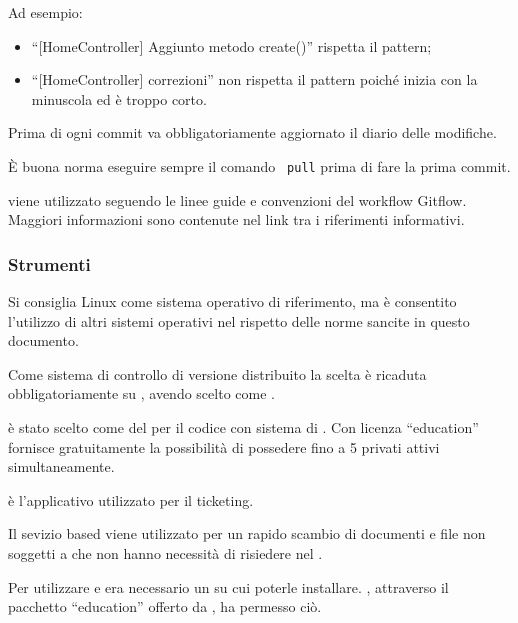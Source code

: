 \documentclass[a4paper, titlepage]{article}
\begin{document}
Ad esempio:
\begin{itemize}
	\item ``[HomeController] Aggiunto metodo create()'' rispetta il pattern;
	\item ``[HomeController] correzioni'' non rispetta il pattern poiché inizia con la minuscola ed è troppo corto. 
\end{itemize}

Prima di ogni commit va obbligatoriamente aggiornato il diario delle modifiche.

È buona norma eseguire sempre il comando \texttt{ pull} prima di fare la prima commit.

 viene utilizzato seguendo le linee guide e convenzioni del workflow Gitflow. Maggiori informazioni sono contenute nel link tra i riferimenti informativi.

\subsubsection{Strumenti}

Si consiglia Linux come sistema operativo di riferimento, ma è consentito l'utilizzo di altri sistemi operativi nel rispetto delle norme sancite in questo documento.

Come sistema di controllo di versione distribuito la scelta è ricaduta obbligatoriamente su , avendo scelto  come .

 è stato scelto come  del  per il codice con sistema di  .
Con licenza ``education'' fornisce gratuitamente la possibilità di possedere fino a 5  privati attivi simultaneamente.

 è l'applicativo utilizzato per il ticketing.

Il sevizio  based  viene utilizzato per un rapido scambio di documenti e file non soggetti a  che non hanno necessità di risiedere nel .

Per utilizzare  e  era necessario un  su cui poterle installare. , attraverso il pacchetto ``education'' offerto da , ha permesso ciò.
\end{document}
